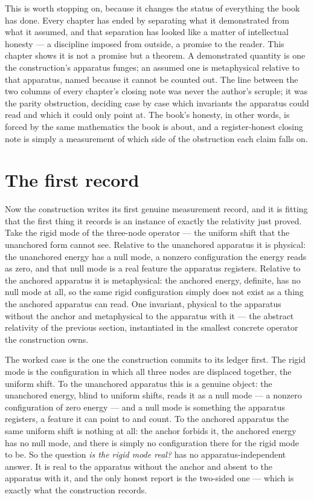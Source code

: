 This is worth stopping on, because it changes the status of everything the book has done. Every chapter
has ended by separating what it demonstrated from what it assumed, and that separation has looked like a
matter of intellectual honesty --- a discipline imposed from outside, a promise to the reader. This
chapter shows it is not a promise but a theorem. A demonstrated quantity is one the construction's
apparatus funges; an assumed one is metaphysical relative to that apparatus, named because it cannot be
counted out. The line between the two columns of every chapter's closing note was never the author's
scruple; it was the parity obstruction, deciding case by case which invariants the apparatus could read
and which it could only point at. The book's honesty, in other words, is forced by the same mathematics
the book is about, and a register-honest closing note is simply a measurement of which side of the
obstruction each claim falls on.

\section{The first record}
\label{se:the-first-record}

Now the construction writes its first genuine measurement record, and it is fitting that the first thing
it records is an instance of exactly the relativity just proved. Take the rigid mode of the three-node
operator --- the uniform shift that the unanchored form cannot see. Relative to the unanchored apparatus
it is physical: the unanchored energy has a null mode, a nonzero configuration the energy reads as zero,
and that null mode is a real feature the apparatus registers. Relative to the anchored apparatus it is
metaphysical: the anchored energy, definite, has no null mode at all, so the same rigid configuration
simply does not exist as a thing the anchored apparatus can read. One invariant, physical to the
apparatus without the anchor and metaphysical to the apparatus with it --- the abstract relativity of
the previous section, instantiated in the smallest concrete operator the construction owns.

The worked case is the one the construction commits to its ledger first. The rigid mode is the
configuration in which all three nodes are displaced together, the uniform shift. To the unanchored
apparatus this is a genuine object: the unanchored energy, blind to uniform shifts, reads it as a null
mode --- a nonzero configuration of zero energy --- and a null mode is something the apparatus registers,
a feature it can point to and count. To the anchored apparatus the same uniform shift is nothing at all:
the anchor forbids it, the anchored energy has no null mode, and there is simply no configuration there
for the rigid mode to be. So the question \emph{is the rigid mode real?} has no apparatus-independent
answer. It is real to the apparatus without the anchor and absent to the apparatus with it, and the only
honest report is the two-sided one --- which is exactly what the construction records.

